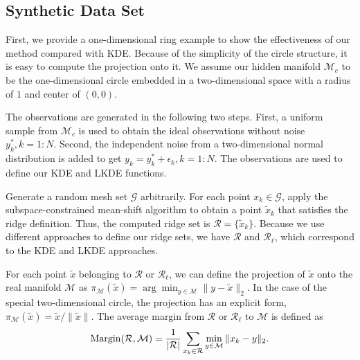 \documentclass[aos,preprint]{imsart}
\theoremstyle{remark}
\begin{document}
\subsection{Synthetic Data Set}
First, we provide a one-dimensional ring example to show the effectiveness of our method compared with KDE. Because of the simplicity of the circle structure, it is easy to compute the projection onto it. We assume our hidden manifold ${\mathcal M}_c$ to be the one-dimensional circle embedded in a two-dimensional space with a radius of $1$ and center of $(0,0)$.

The observations are generated in the following two steps. First, a uniform sample from ${\mathcal M}_c$ is used to obtain the ideal observations without noise $y_k^*, k = 1:N$. Second, the independent noise from a two-dimensional normal distribution is added to get $y_k = y_k^*+\epsilon_k, k=1:N$. The observations are used to define our KDE and LKDE functions.

Generate a random mesh set $\mathcal G$ arbitrarily. For each point $x_k \in \mathcal G$, apply the subspace-constrained mean-shift algorithm to obtain a point $\tilde{x}_k$ that satisfies the ridge definition. Thus, the computed ridge set is ${\mathcal R}=\{\tilde{x}_k\}$. Because we use different approaches to define our ridge sets, we have ${\mathcal R}$ and ${\mathcal R}_\ell$, which correspond to the KDE and LKDE approaches.

For each point $\tilde{x}$ belonging to $\mathcal R$ or ${\mathcal R}_\ell$, we can define the projection of $\tilde{x}$ onto the real manifold $\mathcal M$ as $\pi_{\mathcal M}(\tilde{x}) = \arg\min_{y\in \mathcal M} \|y-\tilde{x}\|_2$. In the case of the special two-dimensional circle, the projection has an explicit form, $\pi_{\mathcal M}(\tilde{x}) = \tilde{x}/\|\tilde{x}\|$. The average margin from $\mathcal R$ or ${\mathcal R}_\ell$ to $\mathcal M$ is defined as
\[
{\rm Margin}({\mathcal R, \mathcal M}) =\frac{1}{|{\mathcal R}|}  \sum_{x_k\in \mathcal R} \min_{y\in \mathcal M}\|x_k-y\|_2.
\]
\end{document}
